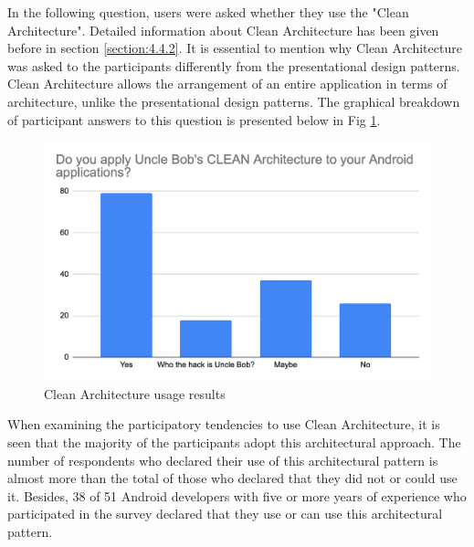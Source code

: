 In the following question, users were asked whether they use the "Clean Architecture". Detailed information about Clean Architecture has been given before in section \ref{section:4.4.2}. It is essential to mention why Clean Architecture was asked to the participants differently from the presentational design patterns. Clean Architecture allows the arrangement of an entire application in terms of architecture, unlike the presentational design patterns. The graphical breakdown of participant answers to this question is presented below in Fig \ref{fig:clean_arch}.
\begin{figure}[ht!]
    \centering
    \includegraphics[scale=0.33]{figures/clean_arch.png}
    \caption{Clean Architecture usage results}
    \label{fig:clean_arch}
\end{figure}
\FloatBarrier

When examining the participatory tendencies to use Clean Architecture, it is seen that the majority of the participants adopt this architectural approach. The number of respondents who declared their use of this architectural pattern is almost more than the total of those who declared that they did not or could use it. Besides, 38 of 51 Android developers with five or more years of experience who participated in the survey declared that they use or can use this architectural pattern.